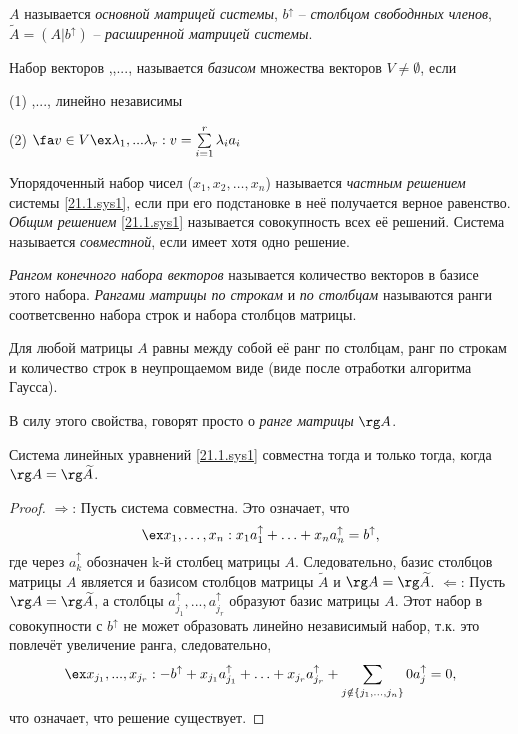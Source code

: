   $A$ называется \textit{основной матрицей системы}, $b^\uparrow$ -- \textit{столбцом свободнных членов}, $\widetilde A = (A|b^\uparrow)$ -- \textit{расширенной матрицей системы}.
  \begin{defn}
  Набор векторов ,,..., называется \textit{базисом} множества векторов $V\neq \emptyset$, если
  
  (1) ,..., линейно независимы
  
  (2) $\fa v \in V \ex \lambda_1,...\lambda_r: v=\sum \limits_{i=1}^r\lambda_ia_i$
  \end{defn}
  
  \begin{defn}
  Упорядоченный набор чисел ($x_1, x_2, \ldots, x_n$) называется \textit{частным решением} системы \ref{21.1.sys1}, если при его подстановке в неё получается верное равенство. \textit{Общим решением} \ref{21.1.sys1} называется совокупность всех её решений. Система называется \textit{совместной}, если имеет хотя одно решение.
  \end{defn}
  \begin{defn}
  \textit{Рангом конечного набора векторов} называется количество векторов в базисе этого набора. \textit{Рангами матрицы по строкам} и \textit{по столбцам} называются ранги соответсвенно набора строк и набора столбцов матрицы.
  \end{defn}
  \begin{lemm} 
  Для любой матрицы $A$ равны между собой её ранг по столбцам, ранг по строкам и количество строк в неупрощаемом виде (виде после отработки алгоритма Гаусса).
  \end{lemm}
  В силу этого свойства, говорят просто о \textit{ранге матрицы} $\rg A$.
  \begin{thm}
  Система линейных уравнений \ref{21.1.sys1} совместна тогда и только тогда, когда $\rg A = \rg \widetilde A$.
  \end{thm}
  \begin{proof}
  $\Rightarrow$: Пусть система совместна. Это означает, что
  \begin{equation*}
  \ex x_1,\ldots, x_n: x_1a_1^\uparrow +\ldots+x_na_n^\uparrow=b^\uparrow,
  \end{equation*}
  где через $a_k^\uparrow$ обозначен k-й столбец матрицы $A$. Следовательно, базис столбцов матрицы $A$  является и базисом столбцов матрицы $\widetilde A$ и $\rg A = \rg \widetilde A$.
  $\Leftarrow$: Пусть $\rg A = \rg \widetilde A$, а столбцы $a_{j_1}^\uparrow,...,a_{j_r}^\uparrow$ образуют базис матрицы $A$. Этот набор в совокупности с $b^\uparrow$ не может образовать линейно независимый набор, т.к. это повлечёт увеличение ранга, следовательно, 
  \begin{equation*}\\ 
  \ex x_{j_1},...,x_{j_r}: -b^\uparrow+x_{j_1}a_{j_1}^\uparrow+\ldots+x_{j_r}a_{j_r}^\uparrow+\sum_{j \notin \{j_1,...,j_n\}}0 a_j^\uparrow = 0,
  \end{equation*} 
  что означает, что решение существует.
  \end{proof}
